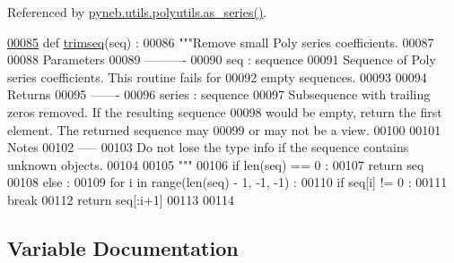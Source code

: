 Referenced by \hyperlink{polyutils_8py_source_l00115}{pyneb.\+utils.\+polyutils.\+as\+\_\+series()}.


\begin{DoxyCode}
\hypertarget{namespacepyneb_1_1utils_1_1polyutils_l00085}{}\hyperlink{namespacepyneb_1_1utils_1_1polyutils_a2d09c123dbbcfd4623784cacf1fc945c}{00085} \textcolor{keyword}{def }\hyperlink{namespacepyneb_1_1utils_1_1polyutils_a2d09c123dbbcfd4623784cacf1fc945c}{trimseq}(seq) :
00086     \textcolor{stringliteral}{"""Remove small Poly series coefficients.}
00087 \textcolor{stringliteral}{}
00088 \textcolor{stringliteral}{    Parameters}
00089 \textcolor{stringliteral}{    ----------}
00090 \textcolor{stringliteral}{    seq : sequence}
00091 \textcolor{stringliteral}{        Sequence of Poly series coefficients. This routine fails for}
00092 \textcolor{stringliteral}{        empty sequences.}
00093 \textcolor{stringliteral}{}
00094 \textcolor{stringliteral}{    Returns}
00095 \textcolor{stringliteral}{    -------}
00096 \textcolor{stringliteral}{    series : sequence}
00097 \textcolor{stringliteral}{        Subsequence with trailing zeros removed. If the resulting sequence}
00098 \textcolor{stringliteral}{        would be empty, return the first element. The returned sequence may}
00099 \textcolor{stringliteral}{        or may not be a view.}
00100 \textcolor{stringliteral}{}
00101 \textcolor{stringliteral}{    Notes}
00102 \textcolor{stringliteral}{    -----}
00103 \textcolor{stringliteral}{    Do not lose the type info if the sequence contains unknown objects.}
00104 \textcolor{stringliteral}{}
00105 \textcolor{stringliteral}{    """}
00106     \textcolor{keywordflow}{if} len(seq) == 0 :
00107         \textcolor{keywordflow}{return} seq
00108     \textcolor{keywordflow}{else} :
00109         \textcolor{keywordflow}{for} i \textcolor{keywordflow}{in} range(len(seq) - 1, -1, -1) :
00110             \textcolor{keywordflow}{if} seq[i] != 0 :
00111                 \textcolor{keywordflow}{break}
00112         \textcolor{keywordflow}{return} seq[:i+1]
00113 
00114 
\end{DoxyCode}


\subsection{Variable Documentation}
\hypertarget{namespacepyneb_1_1utils_1_1polyutils_a5e54a45bb5c6fa4444f663a0b0da0e1f}{}
